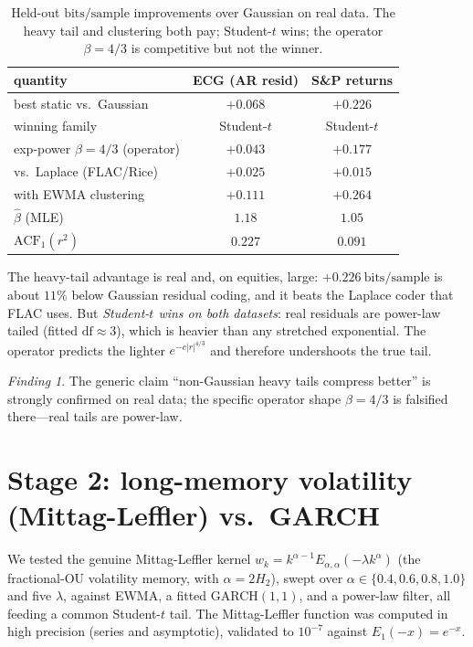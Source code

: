 \documentclass[11pt,reqno]{amsart}
\theoremstyle{plain}
\theoremstyle{definition}
\theoremstyle{remark}
\newtheorem*{finding}{Finding}
\newcommand{\bps}{\mathrm{bits/sample}}
\begin{document}
\begin{table}[h]
\centering\small
\begin{tabular}{lcc}
\toprule
quantity & ECG (AR resid) & S\&P returns \\
\midrule
best static vs.\ Gaussian            & $+0.068$ & $+0.226$ \\
winning family                        & Student-$t$ & Student-$t$ \\
exp-power $\beta=4/3$ (operator)      & $+0.043$ & $+0.177$ \\
vs.\ Laplace (FLAC/Rice)             & $+0.025$ & $+0.015$ \\
with EWMA clustering                  & $+0.111$ & $+0.264$ \\
$\hat\beta$ (MLE)                     & $1.18$   & $1.05$ \\
$\mathrm{ACF}_1(r^2)$                 & $0.227$  & $0.091$ \\
\bottomrule
\end{tabular}
\caption{Held-out $\bps$ improvements over Gaussian on real data. The heavy
tail and clustering both pay; Student-$t$ wins; the operator $\beta=4/3$ is
competitive but not the winner.}
\label{tab:stage1}
\end{table}

The heavy-tail advantage is real and, on equities, large: $+0.226~\bps$ is
about $11\%$ below Gaussian residual coding, and it beats the Laplace coder
that FLAC uses. But \emph{Student-$t$ wins on both datasets}: real residuals are
power-law tailed (fitted $\mathrm{df}\approx3$), which is heavier than any
stretched exponential. The operator predicts the lighter $e^{-c|r|^{4/3}}$ and
therefore undershoots the true tail.

\begin{finding}
The generic claim ``non-Gaussian heavy tails compress better'' is strongly
confirmed on real data; the specific operator shape $\beta=4/3$ is falsified
there---real tails are power-law.
\end{finding}

\section{Stage 2: long-memory volatility (Mittag-Leffler) vs.\ GARCH}
\label{sec:stage2}

We tested the genuine Mittag-Leffler kernel
$w_k=k^{\alpha-1}E_{\alpha,\alpha}(-\lambda k^{\alpha})$ (the fractional-OU
volatility memory, with $\alpha=2H_2$), swept over $\alpha\in\{0.4,0.6,0.8,1.0\}$
and five $\lambda$, against EWMA, a fitted GARCH$(1,1)$, and a power-law filter,
all feeding a common Student-$t$ tail. The Mittag-Leffler function was computed
in high precision (series and asymptotic), validated to $10^{-7}$ against
$E_1(-x)=e^{-x}$.
\end{document}

